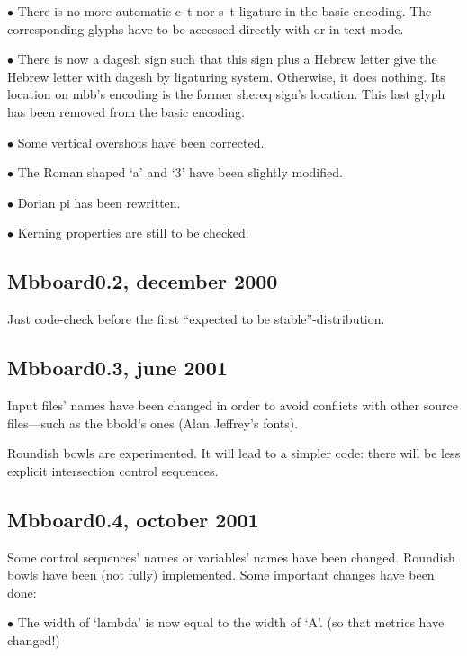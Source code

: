 \item{$\bullet$}
There is no more automatic c--t nor s--t
ligature in the basic encoding.
The corresponding glyphs have to
be accessed directly with \cs{\ctlig}
or \cs{\stlig} in text mode.

\item{$\bullet$}
There is now a dagesh sign such that
this sign plus a Hebrew letter
give the Hebrew letter with dagesh
by ligaturing system. Otherwise,
it does nothing. Its location
on mbb's encoding is the former
shereq sign's location.
This last glyph has been removed
from the basic encoding.

\item{$\bullet$}
Some vertical overshots have been corrected.

\item{$\bullet$}
The Roman shaped `a' and `3' have been slightly modified.

\item{$\bullet$}
Dorian pi has been rewritten.

\item{$\bullet$}
Kerning properties are still to
be checked.

\subsection{Mbboard0.2, december 2000}
Just code-check before the first ``expected
to be stable''-distribution.

\subsection{Mbboard0.3, june 2001}
Input files' names have been changed in order
to avoid conflicts with other source files---such
as the bbold's ones (Alan Jeffrey's fonts).

Roundish bowls are experimented. It will lead
to a simpler code: there will be less explicit
intersection control sequences.

\subsection{Mbboard0.4, october 2001}
Some control sequences' names or variables' names
have been changed. Roundish bowls have been (not fully)
implemented. Some important changes have been done:

\item{$\bullet$}
The width of `lambda' is now equal to the width of `A'.
(so that metrics have changed!)

